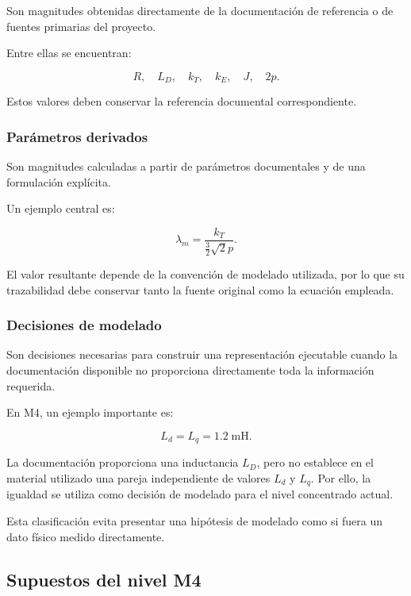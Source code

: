 Son magnitudes obtenidas directamente de la documentación de referencia o de fuentes primarias del proyecto.

Entre ellas se encuentran:

\begin{equation}
R,
\quad
L_D,
\quad
k_T,
\quad
k_E,
\quad
J,
\quad
2p.
\end{equation}

Estos valores deben conservar la referencia documental correspondiente.

\subsubsection{Parámetros derivados}

Son magnitudes calculadas a partir de parámetros documentales y de una formulación explícita.

Un ejemplo central es:

\begin{equation}
\lambda_m
=
\frac{k_T}
{\frac{3}{2}\sqrt{2}p}.
\end{equation}

El valor resultante depende de la convención de modelado utilizada, por lo que su trazabilidad debe conservar tanto la fuente original como la ecuación empleada.

\subsubsection{Decisiones de modelado}

Son decisiones necesarias para construir una representación ejecutable cuando la documentación disponible no proporciona directamente toda la información requerida.

En M4, un ejemplo importante es:

\begin{equation}
L_d=L_q=1.2\;\mathrm{mH}.
\end{equation}

La documentación proporciona una inductancia $L_D$, pero no establece en el material utilizado una pareja independiente de valores $L_d$ y $L_q$. Por ello, la igualdad se utiliza como decisión de modelado para el nivel concentrado actual.

Esta clasificación evita presentar una hipótesis de modelado como si fuera un dato físico medido directamente.

\subsection{Supuestos del nivel M4}

